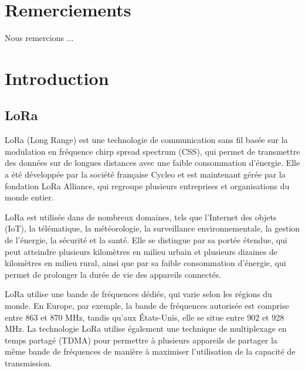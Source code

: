 \documentclass[12pt,a4paper,oneside, titlepage]{report}
\begin{document}
{}
\chapter*{Remerciements}
\renewcommand{\leftmark}{REMERCIEMENTS}

Nous remercions ...\\

\newpage
\renewcommand{\leftmark}{TABLE DES MATI\`{E}RES}
\thispagestyle{fancy}
\tableofcontents


\newpage
{}
\renewcommand{\leftmark}{INTRODUCTION}
\chapter{Introduction}

\section{LoRa}

LoRa (Long Range) est une technologie de communication sans fil basée sur la modulation en fréquence chirp spread spectrum (CSS), qui permet de transmettre des données sur de longues distances avec une faible consommation d'énergie. Elle a été développée par la société française Cycleo et est maintenant gérée par la fondation LoRa Alliance, qui regroupe plusieurs entreprises et organisations du monde entier.

LoRa est utilisée dans de nombreux domaines, tels que l'Internet des objets (IoT), la télématique, la météorologie, la surveillance environnementale, la gestion de l'énergie, la sécurité et la santé. Elle se distingue par sa portée étendue, qui peut atteindre plusieurs kilomètres en milieu urbain et plusieurs dizaines de kilomètres en milieu rural, ainsi que par sa faible consommation d'énergie, qui permet de prolonger la durée de vie des appareils connectés.

LoRa utilise une bande de fréquences dédiée, qui varie selon les régions du monde. En Europe, par exemple, la bande de fréquences autorisée est comprise entre 863 et 870 MHz, tandis qu'aux États-Unis, elle se situe entre 902 et 928 MHz. La technologie LoRa utilise également une technique de multiplexage en temps partagé (TDMA) pour permettre à plusieurs appareils de partager la même bande de fréquences de manière à maximiser l'utilisation de la capacité de transmission.
\end{document}
